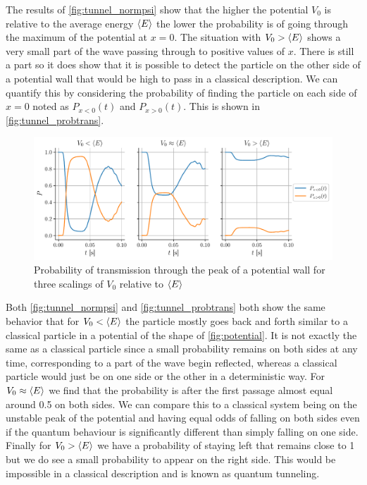 The results of \autoref{fig:tunnel_normpsi} show that the higher the potential $V_0$ is relative to the average energy $\langle E \rangle$ the lower the probability is of going through the maximum of the potential at $x=0$. The situation with $V_0 > \langle E \rangle$ shows a very small part of the wave passing through to positive values of $x$. There is still a part so it does show that it is possible to detect the particle on the other side of a potential wall that would be high to pass in a classical description. We can quantify this by considering the probability of finding the particle on each side of $x=0$ noted as $P_{x<0}(t)$ and $P_{x>0}(t)$. This is shown in \autoref{fig:tunnel_probtrans}.
\begin{figure}[h]
    \centering
    \includegraphics[width=\linewidth]{figures/tunnel_probtrans.pdf}
    \caption{Probability of transmission through the peak of a potential wall for three scalings of $V_0$ relative to $\langle E \rangle$}
    \label{fig:tunnel_probtrans}
\end{figure}

Both \autoref{fig:tunnel_normpsi} and \autoref{fig:tunnel_probtrans} both show the same behavior that for $V_0<\langle E \rangle$ the particle mostly goes back and forth similar to a classical particle in a potential of the shape of \autoref{fig:potential}. It is not exactly the same as a classical particle since a small probability remains on both sides at any time, corresponding to a part of the wave begin reflected, whereas a classical particle would just be on one side or the other in a deterministic way. For $V_0 \approx \langle E \rangle$ we find that the probability is after the first passage almost equal around 0.5 on both sides. We can compare this to a classical system being on the unstable peak of the potential and having equal odds of falling on both sides even if the quantum behaviour is significantly different than simply falling on one side. Finally for $V_0>\langle E \rangle$ we have a probability of staying left that remains close to 1 but we do see a small probability to appear on the right side. This would be impossible in a classical description and is known as quantum tunneling.

